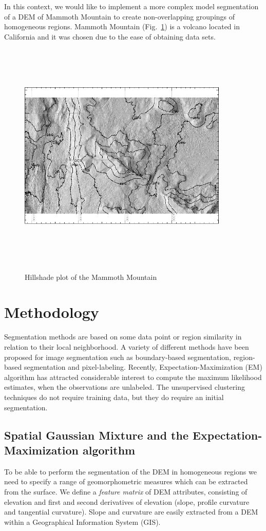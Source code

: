 \documentclass[12pt,letterpaper]{article}
\begin{document}
In this context, we would like to implement a more complex model segmentation of a DEM of Mammoth Mountain to create non-overlapping groupings of homogeneous regions. Mammoth Mountain (Fig.~\ref{fig:fig1}) is a volcano located in California and it was chosen due to the ease of obtaining data sets. 
\begin{figure}[ht!]
\center
      \includegraphics[width=10cm,height=11cm,keepaspectratio]{figs/Topsar5.png}\\
  \caption{Hillshade plot of the Mammoth Mountain  }\label{fig:fig1}
\end{figure}

\section{Methodology}
Segmentation methods are based on some data point or region similarity
in relation to their local neighborhood. A variety of different methods have been proposed
for image segmentation such as boundary-based segmentation, region-based segmentation
and pixel-labeling. Recently, Expectation-Maximization (EM) algorithm has attracted considerable
interest to compute the maximum likelihood estimates, when the observations are unlabeled. 
The unsupervised clustering techniques do not require training data, but they do require an initial
segmentation.

\subsection{Spatial Gaussian Mixture and the Expectation-Maximization algorithm}
To be able to perform the segmentation of the DEM in homogeneous regions
we need to specify a range of geomorphometric measures which can be extracted
from the surface. We define a \textit{feature matrix} of DEM attributes, consisting of elevation and 
first and second derivatives of elevation (slope, profile curvature and tangential curvature).
Slope and curvature are easily extracted from a DEM within a Geographical Information System (GIS).
\end{document}
